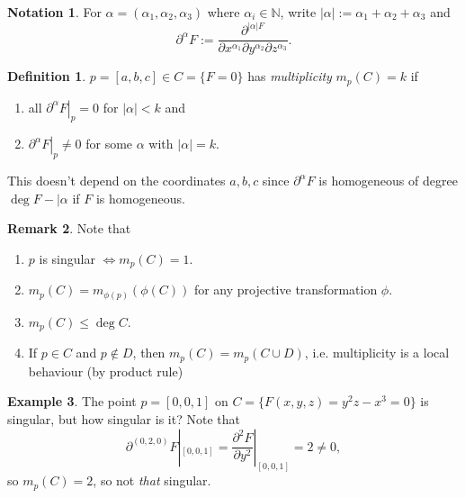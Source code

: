 \documentclass{article}
\newcommand{\N}{\mathbb{N}}
\theoremstyle{definition}
\newtheorem{defn}{Definition}[subsection]
\newtheorem{example}[defn]{Example}
\newtheorem{remark}[defn]{Remark}
\newtheorem*{notation}{Notation}
\begin{document}
\begin{notation}
For $\alpha=(\alpha_1,\alpha_2,\alpha_3)$ where $\alpha_i\in\N$, write $|\alpha|:=\alpha_1+\alpha_2+\alpha_3$ and
\[
\partial^\alpha F:=\frac{\partial^{|\alpha|F}}{\partial x^{\alpha_1}\partial y^{\alpha_2}\partial z^{\alpha_3}}.
\]
\end{notation}
\begin{defn}
$p=[a,b,c]\in C=\{F=0\}$ has \textit{multiplicity} $m_p(C)=k$ if
\begin{enumerate}
\item all $\left.\partial^\alpha F\right|_p=0$ for $|\alpha|<k$ and
\item $\left.\partial^\alpha F\right|_p\neq 0$ for some $\alpha$ with $|\alpha|=k$.
\end{enumerate}
\end{defn}
This doesn't depend on the coordinates $a,b,c$ since $\partial^\alpha F$ is homogeneous of degree $\deg F-|\alpha$ if $F$ is homogeneous.

\begin{remark}
Note that
\begin{enumerate}
\item $p$ is singular $\iff m_p(C)=1$.
\item $m_p(C)=m_{\phi(p)}(\phi(C))$ for any projective transformation $\phi$.
\item $m_p(C)\leq \deg C$.
\item If $p\in C$ and $p\notin D$, then $m_p(C)=m_p(C\cup D)$, i.e. multiplicity is a local behaviour (by product rule)
\end{enumerate}
\end{remark}

\begin{example}
The point $p=[0,0,1]$ on $C=\{F(x,y,z)=y^2z-x^3=0\}$ is singular, but how singular is it? Note that
\[
\partial^{(0,2,0)}F|_{[0,0,1]}=\frac{\partial^2F}{\partial y^2}|_{[0,0,1]}=2\neq 0,
\]
so $m_p(C)=2$, so not \textit{that} singular.
\end{example}
\end{document}
